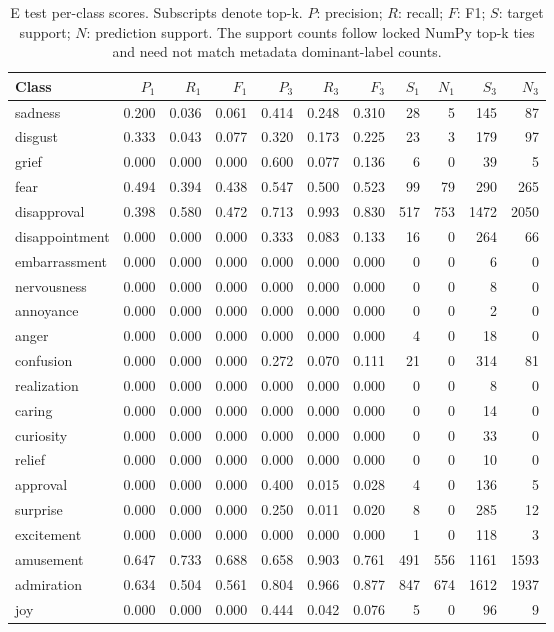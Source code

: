 \begin{table}[!htbp]
\centering
\scriptsize
\setlength{\tabcolsep}{5pt}
\begin{tabular}{lrrrrrrrrrr}
\toprule
Class & $P_1$ & $R_1$ & $F_1$ & $P_3$ & $R_3$ & $F_3$ & $S_1$ & $N_1$ & $S_3$ & $N_3$ \\
\midrule
sadness & 0.200 & 0.036 & 0.061 & 0.414 & 0.248 & 0.310 & 28 & 5 & 145 & 87 \\
disgust & 0.333 & 0.043 & 0.077 & 0.320 & 0.173 & 0.225 & 23 & 3 & 179 & 97 \\
grief & 0.000 & 0.000 & 0.000 & 0.600 & 0.077 & 0.136 & 6 & 0 & 39 & 5 \\
fear & 0.494 & 0.394 & 0.438 & 0.547 & 0.500 & 0.523 & 99 & 79 & 290 & 265 \\
disapproval & 0.398 & 0.580 & 0.472 & 0.713 & 0.993 & 0.830 & 517 & 753 & 1472 & 2050 \\
disappointment & 0.000 & 0.000 & 0.000 & 0.333 & 0.083 & 0.133 & 16 & 0 & 264 & 66 \\
embarrassment & 0.000 & 0.000 & 0.000 & 0.000 & 0.000 & 0.000 & 0 & 0 & 6 & 0 \\
nervousness & 0.000 & 0.000 & 0.000 & 0.000 & 0.000 & 0.000 & 0 & 0 & 8 & 0 \\
annoyance & 0.000 & 0.000 & 0.000 & 0.000 & 0.000 & 0.000 & 0 & 0 & 2 & 0 \\
anger & 0.000 & 0.000 & 0.000 & 0.000 & 0.000 & 0.000 & 4 & 0 & 18 & 0 \\
confusion & 0.000 & 0.000 & 0.000 & 0.272 & 0.070 & 0.111 & 21 & 0 & 314 & 81 \\
realization & 0.000 & 0.000 & 0.000 & 0.000 & 0.000 & 0.000 & 0 & 0 & 8 & 0 \\
caring & 0.000 & 0.000 & 0.000 & 0.000 & 0.000 & 0.000 & 0 & 0 & 14 & 0 \\
curiosity & 0.000 & 0.000 & 0.000 & 0.000 & 0.000 & 0.000 & 0 & 0 & 33 & 0 \\
relief & 0.000 & 0.000 & 0.000 & 0.000 & 0.000 & 0.000 & 0 & 0 & 10 & 0 \\
approval & 0.000 & 0.000 & 0.000 & 0.400 & 0.015 & 0.028 & 4 & 0 & 136 & 5 \\
surprise & 0.000 & 0.000 & 0.000 & 0.250 & 0.011 & 0.020 & 8 & 0 & 285 & 12 \\
excitement & 0.000 & 0.000 & 0.000 & 0.000 & 0.000 & 0.000 & 1 & 0 & 118 & 3 \\
amusement & 0.647 & 0.733 & 0.688 & 0.658 & 0.903 & 0.761 & 491 & 556 & 1161 & 1593 \\
admiration & 0.634 & 0.504 & 0.561 & 0.804 & 0.966 & 0.877 & 847 & 674 & 1612 & 1937 \\
joy & 0.000 & 0.000 & 0.000 & 0.444 & 0.042 & 0.076 & 5 & 0 & 96 & 9 \\
\bottomrule
\end{tabular}
\caption{E test per-class scores. Subscripts denote top-k. $P$: precision; $R$: recall; $F$: F1; $S$: target support; $N$: prediction support. The support counts follow locked NumPy top-k ties and need not match metadata dominant-label counts.}
\label{tab:classes-e_reaction_query}
\end{table}
